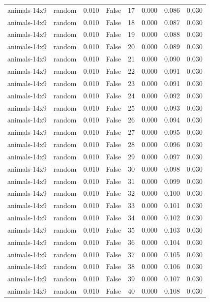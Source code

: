 \begin{tabular}{llrrrrrr}
animals-14x9 & random & 0.010 & False & 17 & 0.000 & 0.086 & 0.030 \\
animals-14x9 & random & 0.010 & False & 18 & 0.000 & 0.087 & 0.030 \\
animals-14x9 & random & 0.010 & False & 19 & 0.000 & 0.088 & 0.030 \\
animals-14x9 & random & 0.010 & False & 20 & 0.000 & 0.089 & 0.030 \\
animals-14x9 & random & 0.010 & False & 21 & 0.000 & 0.090 & 0.030 \\
animals-14x9 & random & 0.010 & False & 22 & 0.000 & 0.091 & 0.030 \\
animals-14x9 & random & 0.010 & False & 23 & 0.000 & 0.091 & 0.030 \\
animals-14x9 & random & 0.010 & False & 24 & 0.000 & 0.092 & 0.030 \\
animals-14x9 & random & 0.010 & False & 25 & 0.000 & 0.093 & 0.030 \\
animals-14x9 & random & 0.010 & False & 26 & 0.000 & 0.094 & 0.030 \\
animals-14x9 & random & 0.010 & False & 27 & 0.000 & 0.095 & 0.030 \\
animals-14x9 & random & 0.010 & False & 28 & 0.000 & 0.096 & 0.030 \\
animals-14x9 & random & 0.010 & False & 29 & 0.000 & 0.097 & 0.030 \\
animals-14x9 & random & 0.010 & False & 30 & 0.000 & 0.098 & 0.030 \\
animals-14x9 & random & 0.010 & False & 31 & 0.000 & 0.099 & 0.030 \\
animals-14x9 & random & 0.010 & False & 32 & 0.000 & 0.100 & 0.030 \\
animals-14x9 & random & 0.010 & False & 33 & 0.000 & 0.101 & 0.030 \\
animals-14x9 & random & 0.010 & False & 34 & 0.000 & 0.102 & 0.030 \\
animals-14x9 & random & 0.010 & False & 35 & 0.000 & 0.103 & 0.030 \\
animals-14x9 & random & 0.010 & False & 36 & 0.000 & 0.104 & 0.030 \\
animals-14x9 & random & 0.010 & False & 37 & 0.000 & 0.105 & 0.030 \\
animals-14x9 & random & 0.010 & False & 38 & 0.000 & 0.106 & 0.030 \\
animals-14x9 & random & 0.010 & False & 39 & 0.000 & 0.107 & 0.030 \\
animals-14x9 & random & 0.010 & False & 40 & 0.000 & 0.108 & 0.030 \\

\end{tabular}
